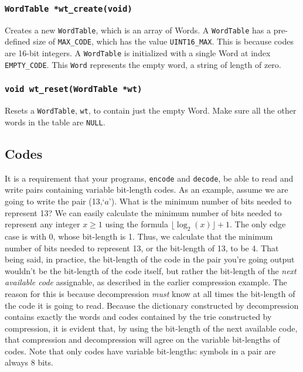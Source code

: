 \documentclass{article}
\begin{document}
\subsubsection{\texttt{WordTable *wt\_create(void)}}
Creates a new \texttt{WordTable}, which is an array of Words.  A
\texttt{WordTable} has a pre-defined size of \texttt{MAX\_CODE}, which
has the value \texttt{UINT16\_MAX}. This is because codes are 16-bit
integers.  A \texttt{WordTable} is initialized with a single Word at
index \texttt{EMPTY\_CODE}. This \texttt{Word} represents the empty
word, a string of length of zero.

\subsubsection{\texttt{void wt\_reset(WordTable *wt)}}
Resets a \texttt{WordTable}, \texttt{wt}, to contain just the empty
Word. Make sure all the other words in the table are \texttt{NULL}.

\subsection{Codes}

It is a requirement that your programs, \texttt{encode} and \texttt{decode},
be able to read and write pairs containing variable bit-length codes. As an
example, assume we are going to write the pair (13,\;`$a$'). What is the minimum
number of bits needed to represent 13? We can easily calculate the minimum
number of bits needed to represent any integer $x \geq 1$ using the formula
$\lfloor \log_2 (x) \rfloor + 1$. The only edge case is with 0, whose bit-length
is 1. Thus, we calculate that the minimum number of bits needed to represent 13,
or the bit-length of 13, to be 4. That being said, in practice, the bit-length of
the code in the pair you're going output wouldn't be the bit-length of the code
itself, but rather the bit-length of the \emph{next available code} assignable, as
described in the earlier compression example. The reason for this is because
decompression \emph{must} know at all times the bit-length of the code it is going
to read. Because the dictionary constructed by decompression contains exactly
the words and codes contained by the trie constructed by compression, it is
evident that, by using the bit-length of the next available code, that compression
and decompression will agree on the variable bit-lengths of codes. Note that only
codes have variable bit-lengths: symbols in a pair are always 8 bits.
\end{document}
